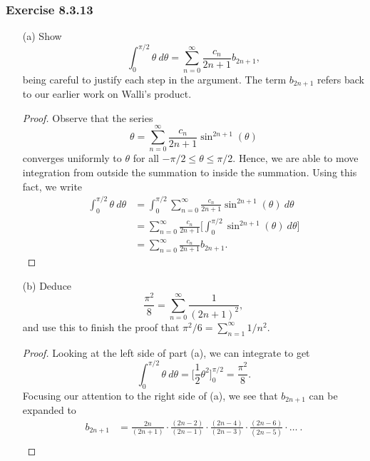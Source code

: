 \subsubsection{Exercise 8.3.13} 
\begin{enumerate}
    \item[(a)] Show 
        \[  \int_{ 0 }^{ \pi /2    }  \theta  \  d \theta = \sum_{ n=0 }^{ \infty  } \frac{ c_{n}  }{  2n+1  }  b_{2n+1},   \] being careful to justify each step in the argument. The term \( b_{2n+1} \) refers back to our earlier work on Walli's product.
        \begin{proof}
        Observe that the series
        \[  \theta = \sum_{ n=0  }^{ \infty  } \frac{ c_{n}  }{ 2n+1  }  \sin^{2n+1} (\theta)  \] converges uniformly to \( \theta  \) for all \( - \pi /2 \leq \theta \leq \pi /2  \). Hence, we are able to move integration from outside the summation to inside the summation. Using this fact, we write 
        \begin{align*}
            \int_{ 0 }^{ \pi / 2  } \theta \ d\theta &= \int_{ 0  }^{ \pi /2  } \sum_{ n=0 }^{ \infty  }  \frac{ c_{n}  }{  2n + 1 } \sin^{2n+1}(\theta) \  d\theta   \\
                                                     &= \sum_{ n=0 }^{ \infty  } \frac{ c_{n}  }{  2n+1  }  \Big[ \int_{ 0 }^{ \pi /2  } \sin^{2n+1}(\theta)  \ d \theta  \Big] \\
                                                     &= \sum_{ n=0  }^{ \infty   } \frac{ c_{n}  }{  2n + 1  }  b_{2n+1}. \tag{Walli's Formula}
        \end{align*}
        \end{proof}
    \item[(b)] Deduce 
        \[  \frac{ \pi^{2}  }{  8  } = \sum_{ n=0  }^{ \infty  } \frac{ 1 }{ (2n+1)^{2} },  \] and use this to finish the proof that \( \pi^{2} / 6  = \sum_{ n=1 }^{ \infty  } 1 / n^{2} \).
        \begin{proof}
        Looking at the left side of part (a), we can integrate to get 
        \[  \int_{ 0 }^{ \pi /2  }  \theta \  d \theta = \Big[ \frac{ 1 }{ 2 }  \theta^{2} \Big]_{0}^{\pi/ 2 } = \frac{ \pi^{2}  }{ 8  }. \]  Focusing our attention to the right side of (a), we see that \( b_{2n+1}  \) can be expanded to
        \begin{align*}
            b_{2n+1}  &= \frac{ 2n }{ (2n+1)  } \cdot \frac{ (2n-2)  }{ (2n-1) } \cdot \frac{ (2n - 4)  }{ (2n - 3)  } \cdot \frac{ (2n-6)  }{ (2n-5) } \cdot  \dots \ .    \\

\end{align*}
\end{proof}
\end{enumerate}
